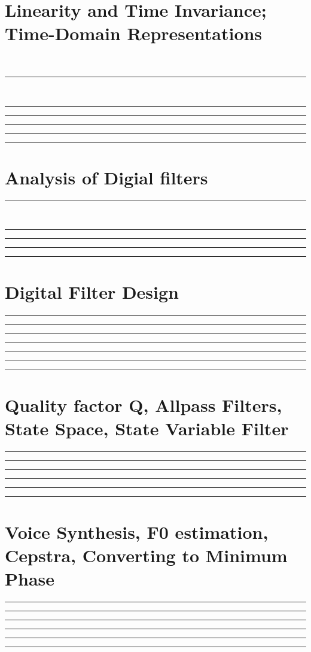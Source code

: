 \documentclass[10pt]{article}
\begin{document}
\newcommand{\josquote}[1]{
    \framebox{
    \parbox{\textwidth}{
    \textit{#1}
    }
    }
}

\newcommand{\paulhint}[1]{
    #1
}

\setlength\parindent{0pt}
\section{Linearity and Time Invariance; Time-Domain Representations}
\\
\noindent\rule[0.5ex]{\linewidth}{0.5pt}
\\
\noindent\rule[0.5ex]{\linewidth}{0.5pt}

\noindent\rule[0.5ex]{\linewidth}{0.5pt}

\noindent\rule[0.5ex]{\linewidth}{0.5pt}

\noindent\rule[0.5ex]{\linewidth}{0.5pt}

\noindent\rule[0.5ex]{\linewidth}{0.5pt}

\section{Analysis of Digial filters}

\noindent\rule[0.5ex]{\linewidth}{0.5pt}
\\
\noindent\rule[0.5ex]{\linewidth}{0.5pt}

\noindent\rule[0.5ex]{\linewidth}{0.5pt}

\noindent\rule[0.5ex]{\linewidth}{0.5pt}

\noindent\rule[0.5ex]{\linewidth}{0.5pt}

\section{Digital Filter Design}

\noindent\rule[0.5ex]{\linewidth}{0.5pt}

\noindent\rule[0.5ex]{\linewidth}{0.5pt}

\noindent\rule[0.5ex]{\linewidth}{0.5pt}

\noindent\rule[0.5ex]{\linewidth}{0.5pt}

\noindent\rule[0.5ex]{\linewidth}{0.5pt}

\noindent\rule[0.5ex]{\linewidth}{0.5pt}

\noindent\rule[0.5ex]{\linewidth}{0.5pt}
\section{Quality factor Q, Allpass Filters, State Space, State Variable Filter}

\noindent\rule[0.5ex]{\linewidth}{0.5pt}

\noindent\rule[0.5ex]{\linewidth}{0.5pt}

\noindent\rule[0.5ex]{\linewidth}{0.5pt}

\noindent\rule[0.5ex]{\linewidth}{0.5pt}

\noindent\rule[0.5ex]{\linewidth}{0.5pt}

\noindent\rule[0.5ex]{\linewidth}{0.5pt}

\section{Voice Synthesis, F0 estimation, Cepstra, Converting to Minimum Phase}
\noindent\rule[0.5ex]{\linewidth}{0.5pt}

\noindent\rule[0.5ex]{\linewidth}{0.5pt}

\noindent\rule[0.5ex]{\linewidth}{0.5pt}

\noindent\rule[0.5ex]{\linewidth}{0.5pt}

\noindent\rule[0.5ex]{\linewidth}{0.5pt}

\noindent\rule[0.5ex]{\linewidth}{0.5pt}

\end{document}
